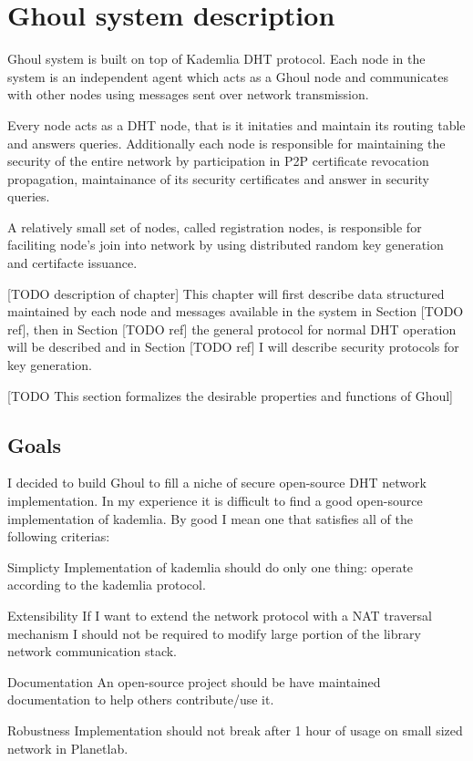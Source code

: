 \chapter{Ghoul system description}
Ghoul system is built on top of Kademlia DHT protocol. Each node in the system
is an independent agent which acts as a Ghoul node and communicates with other
nodes using messages sent over network transmission. 

Every node acts as a DHT node, that is it initaties and maintain its routing
table and answers queries. Additionally each node is responsible for maintaining
the security of the entire network by participation in P2P certificate
revocation propagation, maintainance of its security certificates and answer in
security queries.

A relatively small set of nodes, called registration nodes, is responsible for
faciliting node's join into network by using distributed random key generation
and certifacte issuance.

[TODO description of chapter]
This chapter will first describe data structured maintained by each node and
messages available in the system in Section [TODO ref], then in Section [TODO ref]
the general protocol for normal DHT operation will be described and in Section
[TODO ref] I will describe security protocols for key generation.

[TODO This section formalizes the desirable properties and functions of Ghoul]

\section{Goals}
I decided to build Ghoul to fill a niche of secure open-source DHT network
implementation. In my experience it is difficult to find a good open-source
implementation of kademlia. By good I mean one that satisfies all of the
following criterias:

\begin{description}
  \item{Simplicty} Implementation of kademlia should do only one thing: operate
    according to the kademlia protocol.
  \item{Extensibility} If I want to extend the network protocol with a NAT
    traversal mechanism I should not be required to modify large portion of the
    library network communication stack.
  \item{Documentation} An open-source project should be have maintained
    documentation to help others contribute/use it.
  \item{Robustness} Implementation should not break after 1 hour of usage on
    small sized network in Planetlab.
\end{description}

